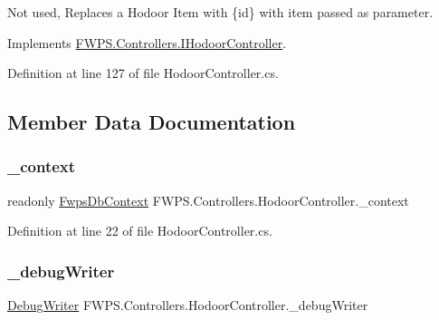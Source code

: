 Not used, Replaces a Hodoor Item with \{id\} with item passed as parameter. 



Implements \mbox{\hyperlink{interface_f_w_p_s_1_1_controllers_1_1_i_hodoor_controller_a9550c77b49185af0d0e6ba79514535f5}{F\+W\+P\+S.\+Controllers.\+I\+Hodoor\+Controller}}.



Definition at line 127 of file Hodoor\+Controller.\+cs.



\subsection{Member Data Documentation}
\mbox{\label{class_f_w_p_s_1_1_controllers_1_1_hodoor_controller_af225a1072fecdf625330a84e5b7846a8}} 
\subsubsection{\texorpdfstring{\+\_\+context}{\_context}}
{\footnotesize\ttfamily readonly \mbox{\hyperlink{class_f_w_p_s_1_1_data_1_1_fwps_db_context}{Fwps\+Db\+Context}} F\+W\+P\+S.\+Controllers.\+Hodoor\+Controller.\+\_\+context\hspace{0.3cm}{\ttfamily [private]}}



Definition at line 22 of file Hodoor\+Controller.\+cs.

\mbox{\label{class_f_w_p_s_1_1_controllers_1_1_hodoor_controller_a192eed3a6a2a5aeaf53c37ca5cfb94c4}} 
\subsubsection{\texorpdfstring{\+\_\+debug\+Writer}{\_debugWriter}}
{\footnotesize\ttfamily \mbox{\hyperlink{class_f_w_p_s_1_1_debug_writer}{Debug\+Writer}} F\+W\+P\+S.\+Controllers.\+Hodoor\+Controller.\+\_\+debug\+Writer\hspace{0.3cm}{\ttfamily [private]}}




